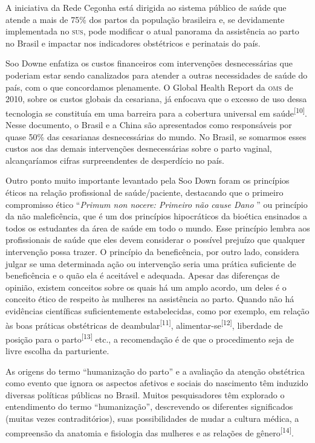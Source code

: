 \documentclass{article}
\begin{document}
A iniciativa da Rede Cegonha está dirigida ao sistema público de saúde que
atende a mais
de 75\% dos partos da população brasileira e, se devidamente implementada no
\textsc{sus}, pode
modificar o atual panorama da assistência ao parto no Brasil e impactar nos
indicadores
obstétricos e perinatais do país.

Soo Downe enfatiza os custos financeiros com intervenções desnecessárias que
poderiam
estar sendo canalizados para atender a outras necessidades de saúde do país, com
o que
concordamos plenamente. O Global Health Report da \textsc{oms} de 2010, sobre os custos
globais
da cesariana, já enfocava que o excesso de uso dessa tecnologia se constituía em
uma
barreira para a cobertura universal em saúde\textsuperscript{[}\textsuperscript{10}\textsuperscript{]}. Nesse documento, o Brasil e a China são apresentados como
responsáveis por quase 50\% das cesarianas desnecessárias do mundo. No Brasil,
se
somarmos esses custos aos das demais intervenções desnecessárias sobre o parto
vaginal,
alcançaríamos cifras surpreendentes de desperdício no país.

Outro ponto muito importante levantado pela Soo Down foram os princípios éticos
na
relação profissional de saúde/paciente, destacando que o primeiro compromisso
ético
“\textit{Primum non nocere: Primeiro não cause Dano}
” ou princípio da não
maleficência, que é um dos princípios hipocráticos da bioética ensinados a todos
os
estudantes da área de saúde em todo o mundo. Esse princípio lembra aos
profissionais de
saúde que eles devem considerar o possível prejuízo que qualquer intervenção
possa
trazer. O princípio da beneficência, por outro lado, considera julgar se uma
determinada
ação ou intervenção seria uma prática suficiente de beneficência e o quão ela é
aceitável e adequada. Apesar das diferenças de opinião, existem conceitos sobre
os quais
há um amplo acordo, um deles é o conceito ético de respeito às mulheres na
assistência
ao parto. Quando não há evidências científicas suficientemente estabelecidas,
como por
exemplo, em relação às boas práticas obstétricas de
deambular\textsuperscript{[}\textsuperscript{11}\textsuperscript{]}, alimentar-se\textsuperscript{[}\textsuperscript{12}\textsuperscript{]}, liberdade de posição para o parto\textsuperscript{[}\textsuperscript{13}\textsuperscript{]}
etc., a recomendação é de que o procedimento seja de
livre escolha da parturiente.

As origens do termo “humanização do parto” e a avaliação da atenção obstétrica
como
evento que ignora os aspectos afetivos e sociais do nascimento têm induzido
diversas
políticas públicas no Brasil. Muitos pesquisadores têm explorado o entendimento
do termo
“humanização”, descrevendo os diferentes significados (muitas vezes
contraditórios),
suas possibilidades de mudar a cultura médica, a compreensão da anatomia e
fisiologia
das mulheres e as relações de gênero\textsuperscript{[}\textsuperscript{14}\textsuperscript{]}.
\end{document}
